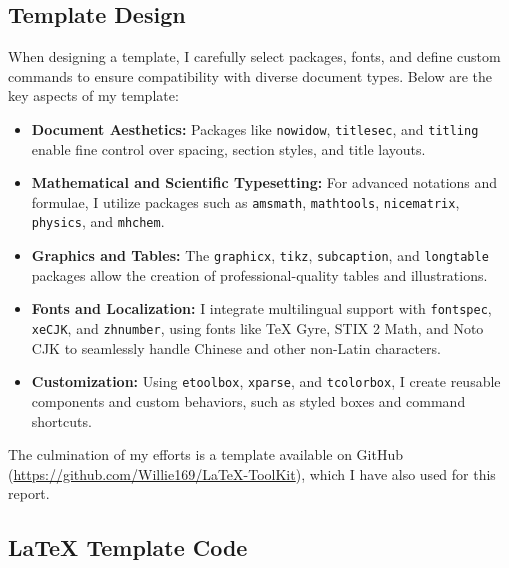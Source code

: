 \documentclass[a4paper,12pt]{article}
\newcounter{xeCJK}
\newcounter{Fonts}
\begin{document}
\subsection{Template Design}
When designing a template, I carefully select packages, fonts, and define custom commands to ensure compatibility with diverse document types. Below are the key aspects of my template:  
\begin{itemize}  
\item \textbf{Document Aesthetics:} Packages like \texttt{nowidow}, \texttt{titlesec}, and \texttt{titling} enable fine control over spacing, section styles, and title layouts.  
\item \textbf{Mathematical and Scientific Typesetting:} For advanced notations and formulae, I utilize packages such as \texttt{amsmath}, \texttt{mathtools}, \texttt{nicematrix}, \texttt{physics}, and \texttt{mhchem}.  
\item \textbf{Graphics and Tables:} The \texttt{graphicx}, \texttt{tikz}, \texttt{subcaption}, and \texttt{longtable} packages allow the creation of professional-quality tables and illustrations.  
\item \textbf{Fonts and Localization:} I integrate multilingual support with \texttt{fontspec}, \texttt{xeCJK}, and \texttt{zhnumber}, using fonts like TeX Gyre, STIX 2 Math, and Noto CJK to seamlessly handle Chinese and other non-Latin characters.  \item \textbf{Customization:} Using \texttt{etoolbox}, \texttt{xparse}, and \texttt{tcolorbox}, I create reusable components and custom behaviors, such as styled boxes and command shortcuts.  
\end{itemize}
The culmination of my efforts is a template available on GitHub (\href{https://github.com/Willie169/LaTeX-ToolKit}{https://github.com/Willie169/LaTeX-ToolKit}), which I have also used for this report.  
\subsection{\LaTeX{} Template Code}

\end{document}
